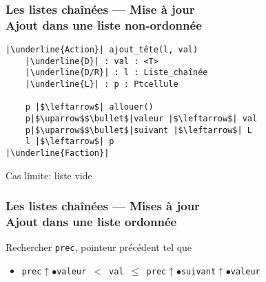 \documentclass[table,handout,tikz,12pt,svgnames]{beamer}
\begin{document}
\begin{frame}[fragile=singleslide]
	\frametitle{Les listes chaînées --- Mise à jour \\\normalsize Ajout dans une liste non-ordonnée}
	\vspace{-0.7cm}
	\begin{block}{} %
		\begin{verbatim}
|\underline{Action}| ajout_tête(l, val)
	|\underline{D}| : val : <T>
	|\underline{D/R}| : l : Liste_chaînée
	|\underline{L}| : p : Ptcellule
	
	p |$\leftarrow$| allouer()
	p|$\uparrow$$\bullet$|valeur |$\leftarrow$| val
	p|$\uparrow$$\bullet$|suivant |$\leftarrow$| L
	l |$\leftarrow$| p
|\underline{Faction}|
		\end{verbatim}
	\end{block}
	\begin{block}{Cas limite: liste vide}\end{block}	
\end{frame}

\begin{frame}[fragile=singleslide]
	\frametitle{Les listes chaînées --- Mises à jour \\\normalsize Ajout dans une liste ordonnée}
	\vspace{5cm}
	\begin{block}{Rechercher \texttt{prec}, pointeur précédent tel que}
		\begin{itemize}
				\item \texttt{prec$\uparrow$$\bullet$valeur $<$ val $\leq$ prec$\uparrow$$\bullet$suivant$\uparrow$$\bullet$valeur}
		\end{itemize}
	\end{block}
\end{frame}
\end{document}
